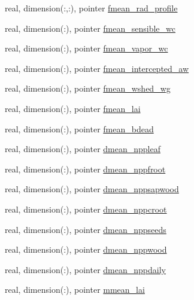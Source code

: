 \begin{DoxyCompactItemize}
real, dimension(\+:,\+:), pointer \hyperlink{structed__state__vars_1_1patchtype_a2e162d02d8483a37726077587b6aa487}{fmean\+\_\+rad\+\_\+profile}
\item 
real, dimension(\+:), pointer \hyperlink{structed__state__vars_1_1patchtype_a8eebd637f78cb8a8704a92c3bdae4103}{fmean\+\_\+sensible\+\_\+wc}
\item 
real, dimension(\+:), pointer \hyperlink{structed__state__vars_1_1patchtype_ac5c5bbd5b0fca339e981808ddbfe56ca}{fmean\+\_\+vapor\+\_\+wc}
\item 
real, dimension(\+:), pointer \hyperlink{structed__state__vars_1_1patchtype_a4dad6fa7ce95654fd772bb38050caa9b}{fmean\+\_\+intercepted\+\_\+aw}
\item 
real, dimension(\+:), pointer \hyperlink{structed__state__vars_1_1patchtype_acb5d4cc8c642d46d718028302bbcfc4d}{fmean\+\_\+wshed\+\_\+wg}
\item 
real, dimension(\+:), pointer \hyperlink{structed__state__vars_1_1patchtype_a425606c7885f11fe4e9d8f2f324337a8}{fmean\+\_\+lai}
\item 
real, dimension(\+:), pointer \hyperlink{structed__state__vars_1_1patchtype_ae9f8cf7cad908fe606637be0e93f730a}{fmean\+\_\+bdead}
\item 
real, dimension(\+:), pointer \hyperlink{structed__state__vars_1_1patchtype_a46c96a62544d8955d804b8d52673e27b}{dmean\+\_\+nppleaf}
\item 
real, dimension(\+:), pointer \hyperlink{structed__state__vars_1_1patchtype_a77f91ada996da07b637000d59194a896}{dmean\+\_\+nppfroot}
\item 
real, dimension(\+:), pointer \hyperlink{structed__state__vars_1_1patchtype_a8c43fe00756e5b83de685fd5523418f0}{dmean\+\_\+nppsapwood}
\item 
real, dimension(\+:), pointer \hyperlink{structed__state__vars_1_1patchtype_a28ea6c21667f2a827951ef0340c1968d}{dmean\+\_\+nppcroot}
\item 
real, dimension(\+:), pointer \hyperlink{structed__state__vars_1_1patchtype_aff6a28395e6d61a080e1ada1e1bae52e}{dmean\+\_\+nppseeds}
\item 
real, dimension(\+:), pointer \hyperlink{structed__state__vars_1_1patchtype_acd6348811b76c3f5cab6fc705cedfc3d}{dmean\+\_\+nppwood}
\item 
real, dimension(\+:), pointer \hyperlink{structed__state__vars_1_1patchtype_ae8a3422db7286e1c7bdeb3c4f9258c88}{dmean\+\_\+nppdaily}
\item 
real, dimension(\+:), pointer \hyperlink{structed__state__vars_1_1patchtype_ab9e70809fefd16cf90daa27374e95ee1}{mmean\+\_\+lai}

\end{DoxyCompactItemize}

